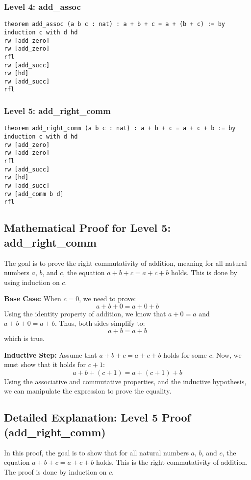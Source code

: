 \documentclass{article}
\begin{document}
\subsubsection*{Level 4: add\_assoc}
\begin{lstlisting}[style=leanstyle]
theorem add_assoc (a b c : nat) : a + b + c = a + (b + c) := by
induction c with d hd
rw [add_zero]
rw [add_zero]
rfl
rw [add_succ]
rw [hd]
rw [add_succ]
rfl
\end{lstlisting}

\subsubsection*{Level 5: add\_right\_comm}
\begin{lstlisting}[style=leanstyle]
theorem add_right_comm (a b c : nat) : a + b + c = a + c + b := by
induction c with d hd
rw [add_zero]
rw [add_zero]
rfl
rw [add_succ]
rw [hd]
rw [add_succ]
rw [add_comm b d]
rfl
\end{lstlisting}

\subsection*{Mathematical Proof for Level 5: add\_right\_comm}
The goal is to prove the right commutativity of addition, meaning for all natural numbers \(a\), \(b\), and \(c\), the equation \(a + b + c = a + c + b\) holds. This is done by using induction on \(c\).

\textbf{Base Case:} When \(c = 0\), we need to prove:
\[
a + b + 0 = a + 0 + b
\]
Using the identity property of addition, we know that \(a + 0 = a\) and \(a + b + 0 = a + b\). Thus, both sides simplify to:
\[
a + b = a + b
\]
which is true.

\textbf{Inductive Step:} Assume that \(a + b + c = a + c + b\) holds for some \(c\). Now, we must show that it holds for \(c + 1\):
\[
a + b + (c + 1) = a + (c + 1) + b
\]
Using the associative and commutative properties, and the inductive hypothesis, we can manipulate the expression to prove the equality.

\subsection*{Detailed Explanation: Level 5 Proof (add\_right\_comm)}
In this proof, the goal is to show that for all natural numbers \(a\), \(b\), and \(c\), the equation \(a + b + c = a + c + b\) holds. This is the right commutativity of addition. The proof is done by induction on \(c\).
\end{document}
